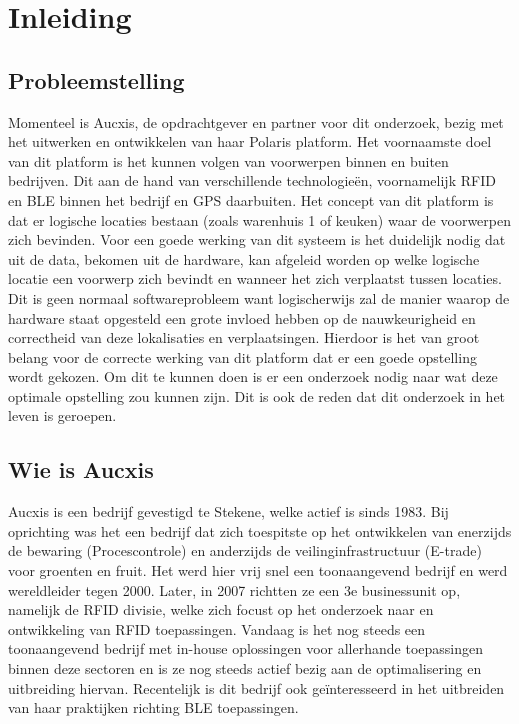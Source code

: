 
\chapter{Inleiding}
\label{ch:inleiding}

\section{Probleemstelling}
\label{sec:probleemstelling}

Momenteel is Aucxis, de opdrachtgever en partner voor dit onderzoek, bezig met het uitwerken en ontwikkelen van haar Polaris platform. Het voornaamste doel van dit platform is het kunnen volgen van voorwerpen binnen en buiten bedrijven. Dit aan de hand van verschillende technologieën, voornamelijk RFID en BLE binnen het bedrijf en GPS daarbuiten. 
Het concept van dit platform is dat er logische locaties bestaan (zoals warenhuis 1 of keuken) waar de voorwerpen zich bevinden. Voor een goede werking van dit systeem is het duidelijk nodig dat uit de data, bekomen uit de hardware, kan afgeleid worden op welke logische locatie een voorwerp zich bevindt en wanneer het zich verplaatst tussen locaties. Dit is geen normaal softwareprobleem want logischerwijs zal de manier waarop de hardware staat opgesteld een grote invloed hebben op de nauwkeurigheid en correctheid van deze lokalisaties en verplaatsingen. Hierdoor is het van groot belang voor de correcte werking van dit platform dat er een goede opstelling wordt gekozen. Om dit te kunnen doen is er een onderzoek nodig naar wat deze optimale opstelling zou kunnen zijn. Dit is ook de reden dat dit onderzoek in het leven is geroepen.

\section{Wie is Aucxis}
\label{sec:wie-is-aucxis}
Aucxis is een bedrijf gevestigd te Stekene, welke actief is sinds 1983. Bij oprichting was het een bedrijf dat zich toespitste op het ontwikkelen van enerzijds de bewaring (Procescontrole) en anderzijds de veilinginfrastructuur (E-trade) voor groenten en fruit. Het werd hier vrij snel een toonaangevend bedrijf en werd wereldleider tegen 2000. Later, in 2007 richtten ze een 3e businessunit op, namelijk de RFID divisie, welke zich focust op het onderzoek naar en ontwikkeling van RFID toepassingen. Vandaag is het nog steeds een toonaangevend bedrijf met in-house oplossingen voor allerhande toepassingen binnen deze sectoren en is ze nog steeds actief bezig aan de optimalisering en uitbreiding hiervan. Recentelijk is dit bedrijf ook geïnteresseerd in het uitbreiden van haar praktijken richting BLE toepassingen.\autocite{Aucxis2020}

